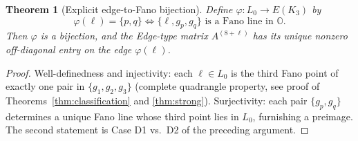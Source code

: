 \documentclass[12pt,a4paper]{article}
\newtheorem{theorem}{Theorem}[section]
\begin{document}
\begin{theorem}[Explicit edge-to-Fano bijection]
\label{thm:edge-fano-bijection}
Define $\varphi: L_0 \to E(K_3)$ by
\[
  \varphi(\ell) = \{p, q\} \iff \{\ell, g_p, g_q\} \text{ is a Fano line in } \mathbb{O}.
\]
Then $\varphi$ is a bijection, and the Edge-type matrix $A^{(8+\ell)}$ has its unique nonzero off-diagonal entry on the edge $\varphi(\ell)$.
\end{theorem}

\begin{proof}
Well-definedness and injectivity: each $\ell \in L_0$ is the third Fano point of exactly one pair in $\{g_1, g_2, g_3\}$ (complete quadrangle property, see proof of Theorems~\ref{thm:classification} and \ref{thm:strong}). Surjectivity: each pair $\{g_p, g_q\}$ determines a unique Fano line whose third point lies in $L_0$, furnishing a preimage. The second statement is Case D1 vs.\ D2 of the preceding argument.
\end{proof}
\end{document}
